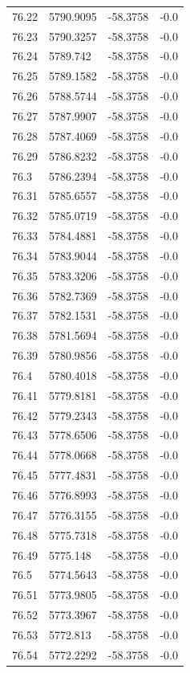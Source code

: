 \begin{table}[H]
\begin{tabular}{llll}
76.22 & 5790.9095 & -58.3758 & -0.0 \\
76.23 & 5790.3257 & -58.3758 & -0.0 \\
76.24 & 5789.742 & -58.3758 & -0.0 \\
76.25 & 5789.1582 & -58.3758 & -0.0 \\
76.26 & 5788.5744 & -58.3758 & -0.0 \\
76.27 & 5787.9907 & -58.3758 & -0.0 \\
76.28 & 5787.4069 & -58.3758 & -0.0 \\
76.29 & 5786.8232 & -58.3758 & -0.0 \\
76.3 & 5786.2394 & -58.3758 & -0.0 \\
76.31 & 5785.6557 & -58.3758 & -0.0 \\
76.32 & 5785.0719 & -58.3758 & -0.0 \\
76.33 & 5784.4881 & -58.3758 & -0.0 \\
76.34 & 5783.9044 & -58.3758 & -0.0 \\
76.35 & 5783.3206 & -58.3758 & -0.0 \\
76.36 & 5782.7369 & -58.3758 & -0.0 \\
76.37 & 5782.1531 & -58.3758 & -0.0 \\
76.38 & 5781.5694 & -58.3758 & -0.0 \\
76.39 & 5780.9856 & -58.3758 & -0.0 \\
76.4 & 5780.4018 & -58.3758 & -0.0 \\
76.41 & 5779.8181 & -58.3758 & -0.0 \\
76.42 & 5779.2343 & -58.3758 & -0.0 \\
76.43 & 5778.6506 & -58.3758 & -0.0 \\
76.44 & 5778.0668 & -58.3758 & -0.0 \\
76.45 & 5777.4831 & -58.3758 & -0.0 \\
76.46 & 5776.8993 & -58.3758 & -0.0 \\
76.47 & 5776.3155 & -58.3758 & -0.0 \\
76.48 & 5775.7318 & -58.3758 & -0.0 \\
76.49 & 5775.148 & -58.3758 & -0.0 \\
76.5 & 5774.5643 & -58.3758 & -0.0 \\
76.51 & 5773.9805 & -58.3758 & -0.0 \\
76.52 & 5773.3967 & -58.3758 & -0.0 \\
76.53 & 5772.813 & -58.3758 & -0.0 \\
76.54 & 5772.2292 & -58.3758 & -0.0 \\

\end{tabular}
\end{table}
